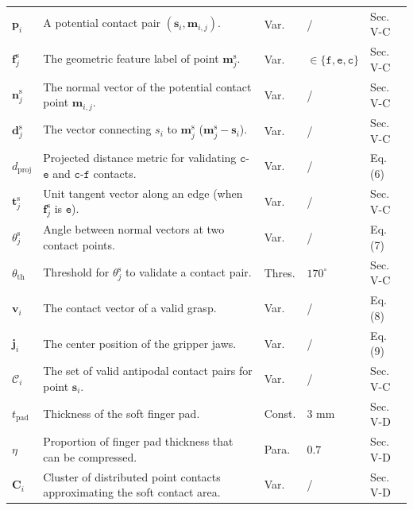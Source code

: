 \documentclass[onecolumn]{IEEEtran}
\begin{document}
\begin{longtable}{p{1cm} p{10cm} p{1cm} p{1.8cm} p{2 cm}}
$\mathbf{p}_i$ & A potential contact pair $(\mathbf{s}_i, \mathbf{m}_{i, j})$. & Var. & / & Sec. V-C \\

$\mathbf{f}_j^\text{s}$ & The geometric feature label of point $\mathbf{m}_j^\text{s}$. & Var. & $\in \{\mathtt{f}, \mathtt{e}, \mathtt{c}\}$ & Sec. V-C \\

$\mathbf{n}_j^\text{s}$ & The normal vector of the potential contact point $\mathbf{m}_{i,j}$. & Var. & / & Sec. V-C \\

$\mathbf{d}_j^\text{s}$ & The vector connecting ${s}_i$ to $\mathbf{m}_j^\text{s}$ ($\mathbf{m}_j^\text{s} - \mathbf{s}_i$). & Var. & / & Sec. V-C \\

$d_{\text{proj}}$ & Projected distance metric for validating $\mathtt{c}$-$\mathtt{e}$ and $\mathtt{c}$-$\mathtt{f}$ contacts. & Var. & / & Eq. (6) \\

$\mathbf{t}_j^\text{s}$ & Unit tangent vector along an edge (when $\mathbf{f}_j^\text{s}$ is $\mathtt{e}$). & Var. & / & Sec. V-C \\

$\theta_j^\text{s}$ & Angle between normal vectors at two contact points. & Var. & / & Eq. (7) \\

$\theta_{\text{th}}$ & Threshold for $\theta_j^\text{s}$ to validate a contact pair. & Thres. & $170^\circ$ & Sec. V-C \\

$\mathbf{v}_i$ & The contact vector of a valid grasp. & Var. & / & Eq. (8) \\

$\mathbf{j}_i$ & The center position of the gripper jaws. & Var. & / & Eq. (9) \\

$\mathcal{C}_i$ & The set of valid antipodal contact pairs for point $\mathbf{s}_i$. & Var. & / & Sec. V-C \\

$t_{\text{pad}}$ & Thickness of the soft finger pad. & Const. & $3$ mm & Sec. V-D \\

$\eta$ & Proportion of finger pad thickness that can be compressed. & Para. & $0.7$ & Sec. V-D \\

$\mathbf{C}_i$ & Cluster of distributed point contacts approximating the soft contact area. & Var. & / & Sec. V-D \\


\end{longtable}
\end{document}
